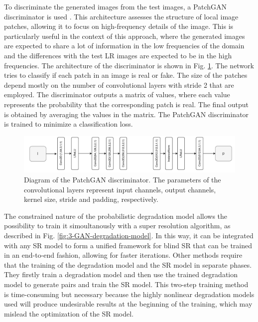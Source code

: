     To discriminate the generated images from the test images, a PatchGAN discriminator is used \cite{isola2018imagetoimage}. This architecture assesses the structure of local image patches, allowing it to focus on high-frequency details of the image. This is particularly useful in the context of this approach, where the generated images are expected to share a lot of information in the low frequencies of the domain and the differences with the test  LR images are expected to be in the high frequencies. The architecture of the discriminator is shown in Fig. \ref{fig:3-slim-patchgan-module}.
    The network tries to classify if each patch in an image is real or fake. The size of the patches depend mostly on the number of convolutional layers with stride 2 that are employed.  The discriminator outputs a matrix of values, where each value represents the probability that the corresponding patch is real. The final output is obtained by averaging the values in the matrix. The PatchGAN discriminator is trained to minimize a classification loss. 

    \begin{figure}[H]
        \centering
        \includegraphics[width=\textwidth]{Includes/3-slim_patchGAN_architecture.pdf}
        \caption{Diagram of the PatchGAN discriminator.
                 The parameters of the convolutional layers represent input channels, output channels, kernel size, stride and padding, respectively. }
        \label{fig:3-slim-patchgan-module}
    \end{figure}

    
    The constrained nature of the probabilistic degradation model allows the possibility to train it simoultanously with a super resolution algorithm, as described in Fig. \ref{fig:3-GAN-degradation-model}.      
    In this way, it can be integrated with any SR model to form a unified framework for blind SR that can be trained in an end-to-end fashion, allowing for faster iterations.
    Other methods \cite{fritsche2019frequency} \cite{wei2020unsupervised} require that the training of the degradation model and the SR model in separate phases. They firstly train a degradation model and then use the trained degradation model to generate pairs and train the SR model.
    This two-step training method is time-consuming but necessary because the highly nonlinear degradation models used will produce undesirable results at the beginning of the training, which may mislead the optimization of the SR model.

